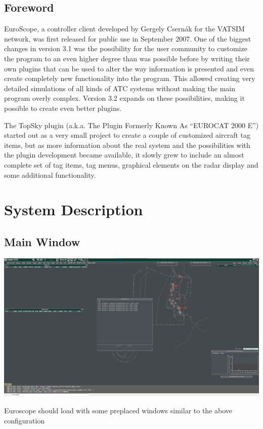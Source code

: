 \documentclass[11pt,a4paper]{memoir}
\begin{document}
\section{Foreword}
EuroScope, a controller client developed by Gergely Csernák for the VATSIM network, was first released for public use in September 2007. One of the biggest changes in version 3.1 was the possibility for the user community to customize the program to an even higher degree than was possible before by writing their own plugins that can be used to alter the way information is presented and even create completely new functionality into the program. This allowed creating very detailed simulations of all kinds of ATC systems without making the main program overly complex. Version 3.2 expands on these possibilities, making it possible to create even better plugins.

The TopSky plugin (a.k.a. The Plugin Formerly Known As “EUROCAT 2000 E”) started out as a very small project to create a couple of customized aircraft tag items, but as more information about the real system and the possibilities with the plugin development became available, it slowly grew to include an almost complete set of tag items, tag menus, graphical elements on the radar display and some additional functionality.

\chapter{System Description}
\section{Main Window}
\includegraphics[width=15cm, keepaspectratio]{img/mainwindow.png}

Euroscope should load with some preplaced windows similar to the above configuration
\end{document}
